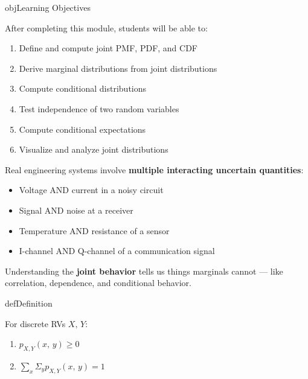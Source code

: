 \begin{PSbox}[unbreakable]{obj}{Learning Objectives}

After completing this module, students will be able to:

\begin{enumerate}
\def\labelenumi{\arabic{enumi}.}
\tightlist
\item
  Define and compute joint PMF, PDF, and CDF
\item
  Derive marginal distributions from joint distributions
\item
  Compute conditional distributions
\item
  Test independence of two random variables
\item
  Compute conditional expectations
\item
  Visualize and analyze joint distributions
\end{enumerate}

\end{PSbox}


Real engineering systems involve \textbf{multiple interacting uncertain quantities}:

\begin{itemize}
\tightlist
\item
  Voltage AND current in a noisy circuit
\item
  Signal AND noise at a receiver
\item
  Temperature AND resistance of a sensor
\item
  I-channel AND Q-channel of a communication signal
\end{itemize}

Understanding the \textbf{joint behavior} tells us things marginals cannot — like correlation, dependence, and conditional behavior.


\begin{PSbox}[unbreakable]{def}{Definition}

For discrete RVs $X,\, Y$:

\end{PSbox}


\begin{enumerate}
\def\labelenumi{\arabic{enumi}.}
\tightlist
\item
  $p_{X,Y}(x,\,y) \ge 0$
\item
  $\sum_{x} \Sigma_{y} p_{X,Y}(x,\,y) = 1$
\end{enumerate}

